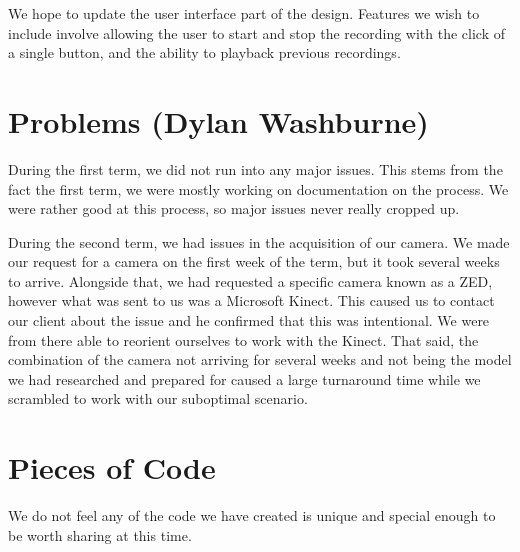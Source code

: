 \documentclass[onecolumn, draftclsnofoot,10pt, compsoc]{IEEEtran}
\begin{document}
We hope to update the user interface part of the design.  Features we wish to include involve allowing the user to start and stop the recording with the click of a single button, and the ability to playback previous recordings.  

\section{Problems (Dylan Washburne)}
During the first term, we did not run into any major issues.
This stems from the fact the first term, we were mostly working on documentation on the process.
We were rather good at this process, so major issues never really cropped up.

During the second term, we had issues in the acquisition of our camera.  
We made our request for a camera on the first week of the term, but it took several weeks to arrive.
Alongside that, we had requested a specific camera known as a ZED, however what was sent to us was a Microsoft Kinect.
This caused us to contact our client about the issue and he confirmed that this was intentional.
We were from there able to reorient ourselves to work with the Kinect. 
That said, the combination of the camera not arriving for several weeks and not being the model we had researched and prepared for caused a large turnaround time while we scrambled to work with our suboptimal scenario.

\section{Pieces of Code}
We do not feel any of the code we have created is unique and special enough to be worth sharing at this time.
\end{document}
